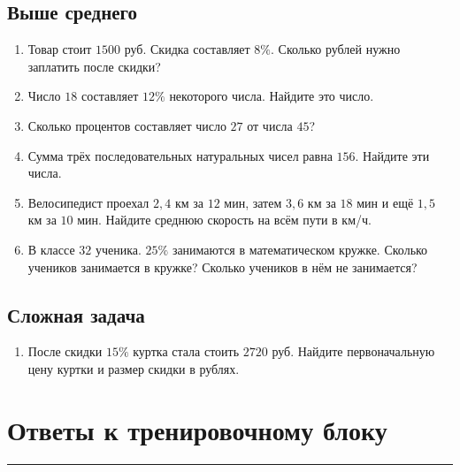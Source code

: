 \documentclass[a4paper,12pt]{article}
\newcommand{\sectionrule}{%
  \par
  \vspace{-0.35em}
  {\color{accent}\rule{\linewidth}{0.7pt}}
  \vspace{0.55em}
}
\begin{document}
\subsection*{Выше среднего}

\begin{enumerate}[label=\arabic*),start=4]

  \item
  Товар стоит $1500$ руб.
  Скидка составляет $8\%$.
  Сколько рублей нужно заплатить после скидки?

  \item
  Число $18$ составляет $12\%$ некоторого числа.
  Найдите это число.

  \item
  Сколько процентов составляет число $27$ от числа $45$?

  \item
  Сумма трёх последовательных натуральных чисел равна $156$.
  Найдите эти числа.

  \item
  Велосипедист проехал $2{,}4$ км за $12$ мин,
  затем $3{,}6$ км за $18$ мин
  и ещё $1{,}5$ км за $10$ мин.
  Найдите среднюю скорость на всём пути в км/ч.

  \item
  В классе $32$ ученика.
  $25\%$ занимаются в математическом кружке.
  Сколько учеников занимается в кружке?
  Сколько учеников в нём не занимается?

\end{enumerate}

\subsection*{Сложная задача}

\begin{enumerate}[label=\arabic*),start=10]

  \item
  После скидки $15\%$ куртка стала стоить $2720$ руб.
  Найдите первоначальную цену куртки
  и размер скидки в рублях.

\end{enumerate}


\clearpage

\section*{Ответы к тренировочному блоку}
\sectionrule
\end{document}
